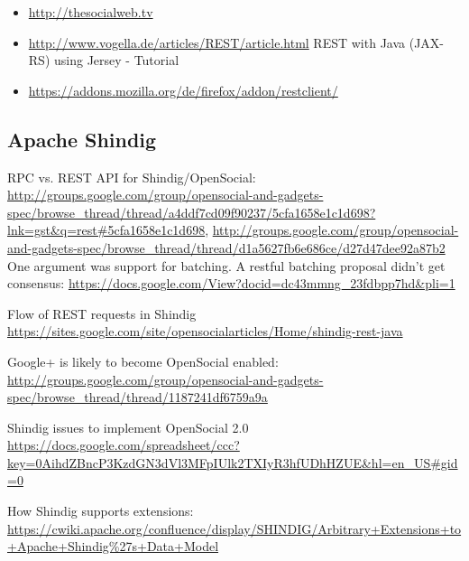 \documentclass[12pt,a4paper]{scrartcl}		%
\begin{document}
\begin{itemize}
\item \url{http://thesocialweb.tv}
\item \url{http://www.vogella.de/articles/REST/article.html} REST with Java (JAX-RS) using Jersey - Tutorial
\item \url{https://addons.mozilla.org/de/firefox/addon/restclient/}

\end{itemize}

\subsection{Apache Shindig}
RPC vs. REST API for Shindig/OpenSocial: \url{http://groups.google.com/group/opensocial-and-gadgets-spec/browse_thread/thread/a4ddf7cd09f90237/5cfa1658e1c1d698?lnk=gst&q=rest#5cfa1658e1c1d698}, \url{http://groups.google.com/group/opensocial-and-gadgets-spec/browse_thread/thread/d1a5627fb6e686ce/d27d47dee92a87b2} One argument was support for batching. A restful batching proposal didn't get consensus: \url{https://docs.google.com/View?docid=dc43mmng_23fdbpp7hd&pli=1}

Flow of REST requests in Shindig \url{https://sites.google.com/site/opensocialarticles/Home/shindig-rest-java}

Google+ is likely to become OpenSocial enabled: \url{http://groups.google.com/group/opensocial-and-gadgets-spec/browse_thread/thread/1187241df6759a9a}

Shindig issues to implement OpenSocial 2.0 \url{https://docs.google.com/spreadsheet/ccc?key=0AihdZBncP3KzdGN3dVl3MFpIUlk2TXIyR3hfUDhHZUE&hl=en_US#gid=0}

How Shindig supports extensions: \url{https://cwiki.apache.org/confluence/display/SHINDIG/Arbitrary+Extensions+to+Apache+Shindig%27s+Data+Model}
\end{document}
